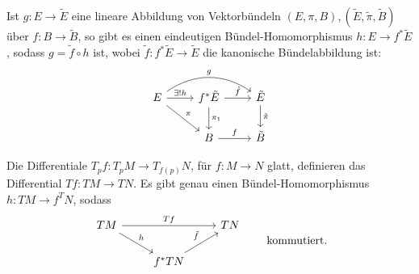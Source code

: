 \begin{lem}
	Ist $ g: E \to \tilde{E} $ eine lineare Abbildung von Vektorbündeln $(E,\pi,B), (\tilde{E}, \tilde{\pi},\tilde{B})$ über $f: B \to \tilde{B}$, so gibt es einen eindeutigen Bündel-Homomorphismus $h: E \to f^*\tilde{E}$, sodass $g = \tilde{f} \circ h$ ist, wobei $ \tilde{f}: f^*\tilde{E} \to \tilde{E} $ die kanonische Bündelabbildung ist:
	\[ \begin{tikzcd}
		E \arrow{r}{\exists !h} \arrow{dr}{\pi} \arrow[bend left=35]{rr}{g} & f^*\tilde{E} \arrow{r}{\tilde{f}} \arrow{d}{\pi_1} & \tilde{E} \arrow{d}{\tilde{\pi}} \\
			& B\arrow{r}{f} & \tilde{B}
		\end{tikzcd} \]
\end{lem}

\begin{exmp*}
	Die Differentiale $ T_pf: T_pM \to T_{f(p)}N $, für $f:M \to N$ glatt, definieren das Differential $Tf: TM \to TN$. Es gibt genau einen Bündel-Homomorphismus $h: TM \to f^TN$, sodass
	\[ \begin{tikzcd}
		TM \arrow{rr}{Tf} \arrow{dr}{h}&&TN\\
		& f^*TN \arrow{ur}{\tilde{f}}
	\end{tikzcd} \qquad \text{kommutiert.} \]
\end{exmp*}